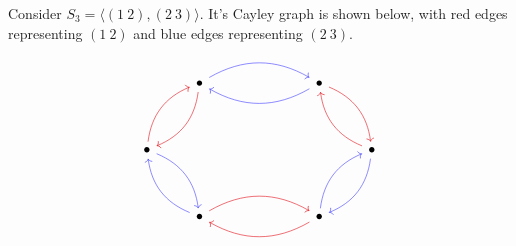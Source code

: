 \begin{example}
    Consider $S_3 = \langle (1 \ 2),(2 \ 3) \rangle$. It's Cayley graph is shown below, with red edges representing $(1 \ 2)$ and blue edges representing $(2 \ 3)$. 

    \[\begin{tikzcd}
        & \bullet &&& \bullet \\
        \\
        \bullet &&&&& \bullet \\
        \\
        & \bullet &&& \bullet
        \arrow[color={rgb,255:red,54;green,51;blue,255}, bend left, from=1-2, to=1-5]
        \arrow[color={rgb,255:red,224;green,0;blue,11}, bend left, from=1-2, to=3-1]
        \arrow[color={rgb,255:red,54;green,51;blue,255}, bend left, from=1-5, to=1-2]
        \arrow[color={rgb,255:red,224;green,0;blue,11}, bend left, from=1-5, to=3-6]
        \arrow[color={rgb,255:red,224;green,0;blue,11}, bend left, from=3-1, to=1-2]
        \arrow[color={rgb,255:red,54;green,51;blue,255}, bend left, from=3-1, to=5-2]
        \arrow[color={rgb,255:red,224;green,0;blue,11}, bend left, from=3-6, to=1-5]
        \arrow[color={rgb,255:red,54;green,51;blue,255}, bend left, from=3-6, to=5-5]
        \arrow[color={rgb,255:red,54;green,51;blue,255}, bend left, from=5-2, to=3-1]
        \arrow[color={rgb,255:red,224;green,0;blue,11}, bend left, from=5-2, to=5-5]
        \arrow[color={rgb,255:red,54;green,51;blue,255}, bend left, from=5-5, to=3-6]
        \arrow[color={rgb,255:red,224;green,0;blue,11}, bend left, from=5-5, to=5-2]
    \end{tikzcd}\]
\end{example}

